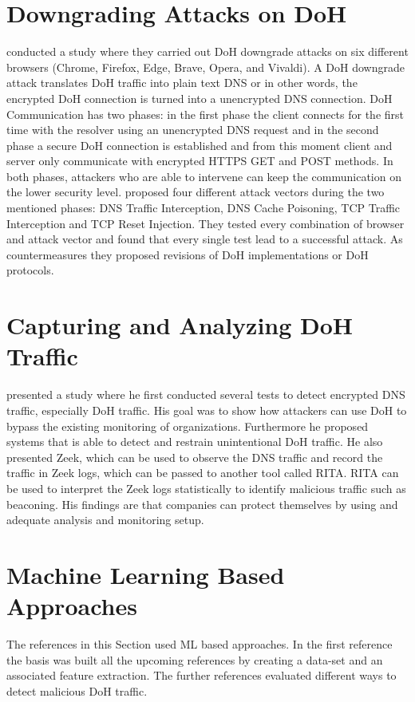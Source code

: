\section{Downgrading Attacks on DoH} \label{downgrading}
\cite{HuangEtAl_DoHDowngradeAttack} conducted a study where they carried out DoH downgrade attacks on six different browsers (Chrome, Firefox, Edge, Brave, Opera, and Vivaldi). A DoH downgrade attack translates DoH traffic into plain text DNS or in other words, the encrypted DoH connection is turned into a unencrypted DNS connection. DoH Communication has two phases: in the first phase the client connects for the first time with the resolver using an unencrypted DNS request and in the second phase a secure DoH connection is established and from this moment client and server only communicate with encrypted HTTPS GET and POST methods. In both phases, attackers who are able to intervene can keep the communication on the lower security level. \cite{HuangEtAl_DoHDowngradeAttack} proposed four different attack vectors during the two mentioned phases: DNS Traffic Interception, DNS Cache Poisoning, TCP Traffic Interception and TCP Reset Injection. They tested every combination of browser and attack vector and found that every single test lead to a successful attack. As countermeasures they proposed revisions of DoH implementations or DoH protocols.

\section{Capturing and Analyzing DoH Traffic} \label{capturing}
\cite{Hjelm_ANewNeedle} presented a study where he first conducted several tests to detect encrypted DNS traffic, especially DoH traffic. His goal was to show how attackers can use DoH to bypass the existing monitoring of organizations. Furthermore he proposed systems that is able to detect and restrain unintentional DoH traffic. He also presented Zeek, which can be used to observe the DNS traffic and record the traffic in Zeek logs, which can be passed to another tool called RITA. RITA can be used to interpret the Zeek logs statistically to identify malicious traffic such as beaconing. His findings are that companies can protect themselves by using and adequate analysis and monitoring setup.

\section{Machine Learning Based Approaches} \label{ml}
The references in this Section used ML based approaches. In the first reference the basis was built all the upcoming references by creating a data-set and an associated feature extraction. The further references evaluated different ways to detect malicious DoH traffic.

